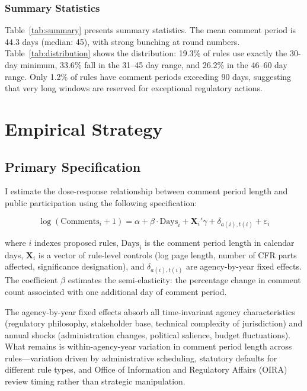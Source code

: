 \documentclass[12pt]{article}
\begin{document}
\subsubsection*{Summary Statistics} Table~\ref{tab:summary} presents summary statistics. The mean comment period is 44.3 days (median: 45), with strong bunching at round numbers. Table~\ref{tab:distribution} shows the distribution: 19.3\% of rules use exactly the 30-day minimum, 33.6\% fall in the 31--45 day range, and 26.2\% in the 46--60 day range. Only 1.2\% of rules have comment periods exceeding 90 days, suggesting that very long windows are reserved for exceptional regulatory actions.





\section{Empirical Strategy}
\label{sec:strategy}

\subsection{Primary Specification}

I estimate the dose-response relationship between comment period length and public participation using the following specification:

\begin{equation}
\log(\text{Comments}_i + 1) = \alpha + \beta \cdot \text{Days}_i + \mathbf{X}_i'\gamma + \delta_{a(i),t(i)} + \varepsilon_i
\label{eq:main}
\end{equation}

\noindent where $i$ indexes proposed rules, $\text{Days}_i$ is the comment period length in calendar days, $\mathbf{X}_i$ is a vector of rule-level controls (log page length, number of CFR parts affected, significance designation), and $\delta_{a(i),t(i)}$ are agency-by-year fixed effects. The coefficient $\beta$ estimates the semi-elasticity: the percentage change in comment count associated with one additional day of comment period.

The agency-by-year fixed effects absorb all time-invariant agency characteristics (regulatory philosophy, stakeholder base, technical complexity of jurisdiction) and annual shocks (administration changes, political salience, budget fluctuations). What remains is within-agency-year variation in comment period length across rules---variation driven by administrative scheduling, statutory defaults for different rule types, and Office of Information and Regulatory Affairs (OIRA) review timing rather than strategic manipulation.
\end{document}
